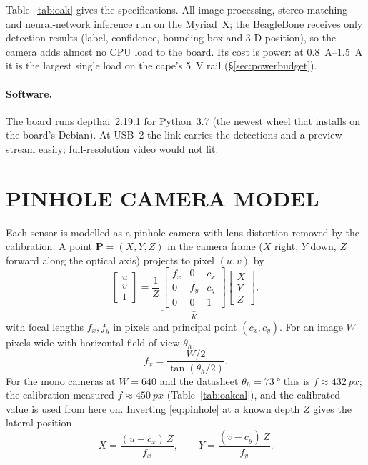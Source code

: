 Table~\ref{tab:oak} gives the specifications. All image processing, stereo
matching and neural-network inference run on the Myriad~X; the BeagleBone
receives only detection results (label, confidence, bounding box and 3-D
position), so the camera adds almost no CPU load to the board. Its cost is
power: at \SIrange{0.8}{1.5}{A} it is the largest single load on the cape's
\SI{5}{V} rail (\S\ref{sec:powerbudget}).

\paragraph{Software.} The board runs depthai~2.19.1 for Python~3.7 (the
newest wheel that installs on the board's Debian). At USB~2 the link carries the detections and a preview
stream easily; full-resolution video would not fit.

\section{PINHOLE CAMERA MODEL}
\label{sec:pinhole}

Each sensor is modelled as a pinhole camera with lens distortion removed by
the calibration. A point $\bm P=(X,Y,Z)$ in the camera frame ($X$ right, $Y$
down, $Z$ forward along the optical axis) projects to pixel $(u,v)$ by
\begin{equation}\label{eq:pinhole}
\begin{bmatrix}u\\v\\1\end{bmatrix}
= \frac{1}{Z}\,
\underbrace{\begin{bmatrix}f_x & 0 & c_x\\ 0 & f_y & c_y\\ 0&0&1\end{bmatrix}}_{K}
\begin{bmatrix}X\\Y\\Z\end{bmatrix},
\end{equation}
with focal lengths $f_x,f_y$ in pixels and principal point $(c_x,c_y)$. For
an image $W$ pixels wide with horizontal field of view $\theta_h$,
\begin{equation}\label{eq:focal}
f_x=\frac{W/2}{\tan(\theta_h/2)} .
\end{equation}
For the mono cameras at $W=640$ and the datasheet $\theta_h=\SI{73}{\degree}$
this is $f\approx\SI{432}{px}$; the calibration measured
$f\approx\SI{450}{px}$ (Table~\ref{tab:oakcal}), and the calibrated value is
used from here on. Inverting \eqref{eq:pinhole} at a known depth $Z$
gives the lateral position
\begin{equation}\label{eq:backproject}
X=\frac{(u-c_x)\,Z}{f_x},\qquad Y=\frac{(v-c_y)\,Z}{f_y}.
\end{equation}

